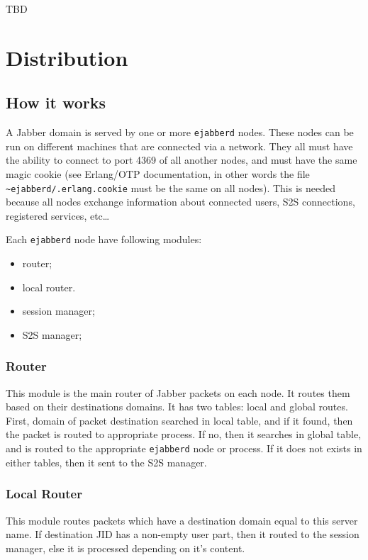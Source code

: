 \documentclass[10pt]{article}
\newcommand{\ejabberd}{\texttt{ejabberd}}
\newcommand{\Jabber}{Jabber}
\begin{document}
TBD

\section{Distribution}
\label{sec:distribution}


\subsection{How it works}
\label{sec:howitworks}



A \Jabber{} domain is served by one or more \ejabberd{} nodes.  These nodes can
be run on different machines that are connected via a network.  They all must
have the ability to connect to port 4369 of all another nodes, and must have
the same magic cookie (see Erlang/OTP documentation, in other words the file
\texttt{\~{}ejabberd/.erlang.cookie} must be the same on all nodes). This is
needed because all nodes exchange information about connected users, S2S
connections, registered services, etc\ldots



Each \ejabberd{} node have following modules:
\begin{itemize}
\item router;
\item local router.
\item session manager;
\item S2S manager;
\end{itemize}


\subsubsection{Router}

This module is the main router of \Jabber{} packets on each node.  It routes
them based on their destinations domains.  It has two tables: local and global
routes.  First, domain of packet destination searched in local table, and if it
found, then the packet is routed to appropriate process.  If no, then it
searches in global table, and is routed to the appropriate \ejabberd{} node or
process.  If it does not exists in either tables, then it sent to the S2S
manager.


\subsubsection{Local Router}

This module routes packets which have a destination domain equal to this server
name.  If destination JID has a non-empty user part, then it routed to the
session manager, else it is processed depending on it's content.
\end{document}
